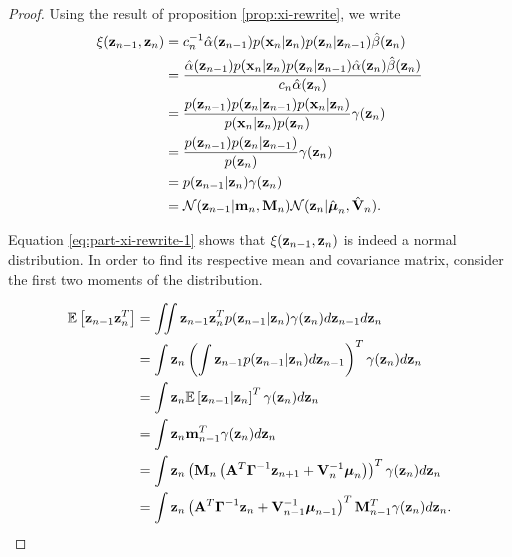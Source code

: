\documentclass[11pt]{article}
\numberwithin{equation}{section}
\newcommand{\expectation}[1]{\mathbb{E}\left[#1\right]}
\newcommand{\x}{{\bf x}}
\newcommand{\z}{{\bf z}}
\newcommand{\N}{\mathcal{N}}
\begin{document}
\begin{proof}
	Using the result of proposition \ref{prop:xi-rewrite}, we write
	\begin{align}
		\xi(\z_{n-1}, \z_n) 
		&= c_n^{-1} \hat\alpha(\z_{n-1}) p(\x_n \vert \z_n) p(\z_n \vert \z_{n-1}) \hat\beta(\z_n) \\
		&= \frac{\hat\alpha(\z_{n-1}) p(\x_n \vert \z_n) p(\z_n \vert \z_{n-1}) \hat\alpha(\z_n)\hat\beta(\z_n)}{c_n \hat\alpha(\z_n)}\\
		&= \frac{p(\z_{n-1}) p(\z_n \vert \z_{n-1}) p(\x_n \vert \z_n)}{p(\x_n \vert \z_n) p(\z_n)} \label{eq:part-xi-rewrite-1}  \gamma(\z_n)\\
		&= \frac{p(\z_{n-1}) p(\z_n \vert \z_{n-1})}{p(\z_n)}  \gamma(\z_n)\\
		&= p(\z_{n-1} \vert \z_n) \gamma(\z_n) \\
		&= \N(\z_{n-1} \vert {\bf m}_n, {\bf M}_n) \N(\z_n \vert \hat{\boldsymbol\mu}_n, \hat{\bf V}_n) \label{eq:part-xi-rewrite}.
	\end{align}
	
	
	Equation \eqref{eq:part-xi-rewrite-1} shows that $\xi(\z_{n-1}, \z_n)$ is indeed a normal distribution. In order to find its respective mean and covariance matrix, consider the first two moments of the distribution.
	
	\begin{align}
		\expectation{\z_{n-1}\z_n^T} 
		&= \iint \z_{n-1}\z_{n}^T p(\z_{n-1} \vert \z_n) \gamma(\z_n) d\z_{n-1}d\z_n\\
		&= \int \z_n \left(\int \z_{n-1} p(\z_{n-1} \vert \z_n)  d\z_{n-1} \right)^T \gamma(\z_{n}) d\z_n\\
		&= \int \z_n \expectation{\z_{n-1} \vert \z_n}^T \gamma(\z_n) d\z_n\\
		&= \int \z_n {\bf m}_{n-1}^T \gamma(\z_n) d\z_n \\
		&= \int \z_n \left({\bf M}_n \left({\bf A}^T\boldsymbol\Gamma^{-1}\z_{n+1} + {\bf V}_n^{-1}\boldsymbol\mu_n\right)\right)^T \gamma(\z_n) d\z_n\\
		&= \int \z_n \left({\bf A}^T\boldsymbol\Gamma^{-1}\z_{n} + {\bf V}_{n-1}^{-1}\boldsymbol\mu_{n-1}\right)^T {\bf M}_{n-1}^T \gamma(\z_n) d\z_n \label{eq:part-covzn-1}.
	\end{align}
	

\end{proof}
\end{document}
